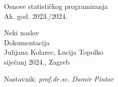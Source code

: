 \documentclass[12pt]{report}
\begin{document}
 
		
		
		
		\begin{titlepage}
			\begin{center}
				\LARGE Osnove statističkog programiranja\\
				\large Ak. god. 2023./2024.\\
				
				
				\huge Neki naslov\\
				\Large Dokumentacija\\
				
				\normalsize
				Julijana Kolarec, Lucija Topolko\\
				
				
				siječanj 2024., Zagreb\\
				
				
				Nastavnik: \textit{prof.dr.sc. Damir Pintar}\\
				
			\end{center}
			
			
		\end{titlepage}
		
		
		\tableofcontents
		
		
		
		
		
		\begingroup
		\renewcommand*\listfigurename{Indeks slika i dijagrama}
		\listoffigures
		\endgroup
		
		
		
		\eject 
		
		
		
	
\end{document}
